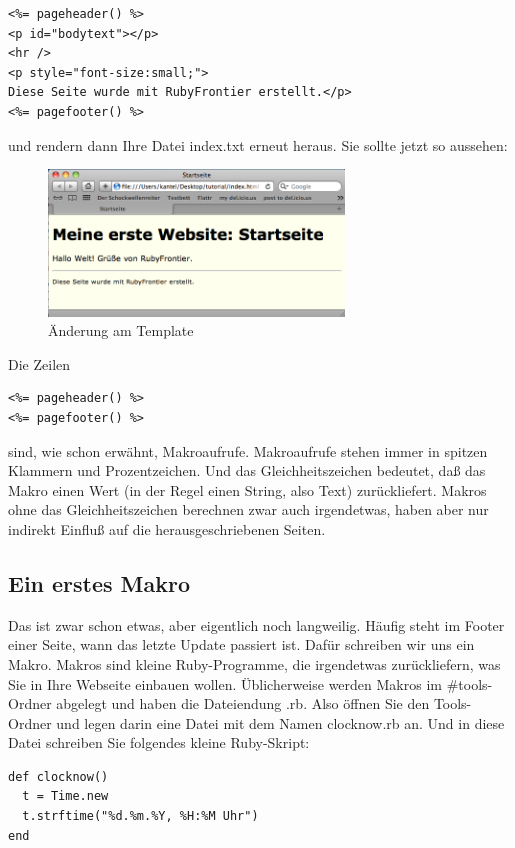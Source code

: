 \documentclass[11pt]{report}
\begin{document}
\begin{verbatim}
<%= pageheader() %>
<p id="bodytext"></p>
<hr />
<p style="font-size:small;">
Diese Seite wurde mit RubyFrontier erstellt.</p>
<%= pagefooter() %>
\end{verbatim}

und rendern dann Ihre Datei index.txt erneut heraus. Sie sollte jetzt
so aussehen:

\begin{figure}[h!]
\centering
\includegraphics[width=0.7\textwidth]{./images/index02.png}
\caption{\label{index02}Änderung am Template}
\end{figure}


Die Zeilen


\begin{verbatim}
<%= pageheader() %>
<%= pagefooter() %>
\end{verbatim}

sind, wie schon erwähnt, Makroaufrufe. Makroaufrufe stehen immer in
spitzen Klammern und Prozentzeichen. Und das Gleichheitszeichen
bedeutet, daß das Makro einen Wert (in der Regel einen String, also
Text) zurückliefert. Makros ohne das Gleichheitszeichen berechnen zwar
auch irgendetwas, haben aber nur indirekt Einfluß auf die
herausgeschriebenen Seiten.
\subsection{Ein erstes Makro}
\label{sec-1-2-2-3}


Das ist zwar schon etwas, aber eigentlich noch langweilig. Häufig
steht im Footer einer Seite, wann das letzte Update passiert
ist. Dafür schreiben wir uns ein Makro. Makros sind kleine
Ruby-Programme, die irgendetwas zurückliefern, was Sie in Ihre
Webseite einbauen wollen. Üblicherweise werden Makros im \#tools-Ordner
abgelegt und haben die Dateiendung .rb. Also öffnen Sie den
Tools-Ordner und legen darin eine Datei mit dem Namen clocknow.rb
an. Und in diese Datei schreiben Sie folgendes kleine Ruby-Skript:


\begin{verbatim}
def clocknow()
  t = Time.new
  t.strftime("%d.%m.%Y, %H:%M Uhr")
end
\end{verbatim}
\end{document}
